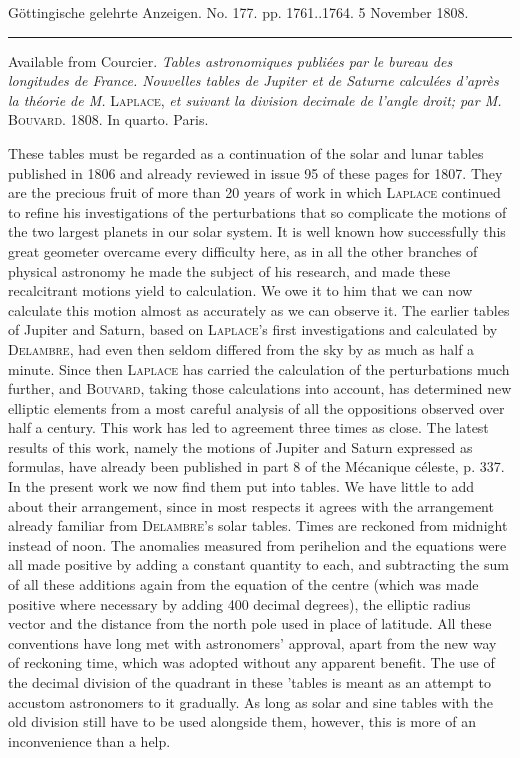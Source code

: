 \clearpage
{}
\begin{center}\small Göttingische gelehrte Anzeigen. No. 177. pp. 1761..1764. 5 November 1808.\\[3pt]\rule{.72\linewidth}{.3pt}\end{center}

Available from Courcier. \emph{Tables astronomiques publiées par le bureau des longitudes de France. Nouvelles tables de Jupiter et de Saturne calculées d'après la théorie de M. }\textsc{Laplace}, \emph{et suivant la division decimale de l'angle droit; par M.} \textsc{Bouvard}. 1808. In quarto. Paris.

These tables must be regarded as a continuation of the solar and lunar tables published in 1806 and already reviewed in issue 95 of these pages for 1807. They are the precious fruit of more than 20 years of work in which \textsc{Laplace} continued to refine his investigations of the perturbations that so complicate the motions of the two largest planets in our solar system. It is well known how successfully this great geometer overcame every difficulty here, as in all the other branches of physical astronomy he made the subject of his research, and made these recalcitrant motions yield to calculation. We owe it to him that we can now calculate this motion almost as accurately as we can observe it. The earlier tables of Jupiter and Saturn, based on \textsc{Laplace}’s first investigations and calculated by \textsc{Delambre}, had even then seldom differed from the sky by as much as half a minute. Since then \textsc{Laplace} has carried the calculation of the perturbations much further, and \textsc{Bouvard}, taking those calculations into account, has determined new elliptic elements from a most careful analysis of all the oppositions observed over half a century. This work has led to agreement three times as close. The latest results of this work, namely the motions of Jupiter and Saturn expressed as formulas, have already been published in part 8 of the Mécanique céleste, p. 337. In the present work we now find them put into tables. We have little to add about their arrangement, since in most respects it agrees with the arrangement already familiar from \textsc{Delambre}’s solar tables. Times are reckoned from midnight instead of noon. The anomalies measured from perihelion and the equations were all made positive by adding a constant quantity to each, and subtracting the sum of all these additions again from the equation of the centre (which was made positive where necessary by adding 400 decimal degrees), the elliptic radius vector and the distance from the north pole used in place of latitude. All these conventions have long met with astronomers’ approval, apart from the new way of reckoning time, which was adopted without any apparent benefit. The use of the decimal division of the quadrant in these 'tables is meant as an attempt to accustom astronomers to it gradually. As long as solar and sine tables with the old division still have to be used alongside them, however, this is more of an inconvenience than a help.

